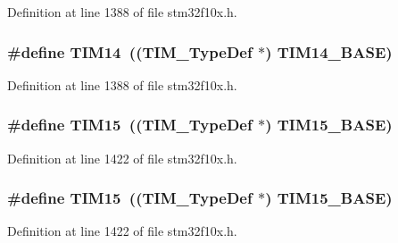Definition at line 1388 of file stm32f10x.\+h.

\subsubsection[{\texorpdfstring{T\+I\+M14}{TIM14}}]{\setlength{\rightskip}{0pt plus 5cm}\#define T\+I\+M14~(({\bf T\+I\+M\+\_\+\+Type\+Def} $\ast$) {\bf T\+I\+M14\+\_\+\+B\+A\+SE})}\hypertarget{group___peripheral__declaration_ga2dd30f46fad69dd73e1d8941a43daffe}{}\label{group___peripheral__declaration_ga2dd30f46fad69dd73e1d8941a43daffe}


Definition at line 1388 of file stm32f10x.\+h.

\subsubsection[{\texorpdfstring{T\+I\+M15}{TIM15}}]{\setlength{\rightskip}{0pt plus 5cm}\#define T\+I\+M15~(({\bf T\+I\+M\+\_\+\+Type\+Def} $\ast$) {\bf T\+I\+M15\+\_\+\+B\+A\+SE})}\hypertarget{group___peripheral__declaration_ga87e4b442041d1c03a6af113fbe04a182}{}\label{group___peripheral__declaration_ga87e4b442041d1c03a6af113fbe04a182}


Definition at line 1422 of file stm32f10x.\+h.

\subsubsection[{\texorpdfstring{T\+I\+M15}{TIM15}}]{\setlength{\rightskip}{0pt plus 5cm}\#define T\+I\+M15~(({\bf T\+I\+M\+\_\+\+Type\+Def} $\ast$) {\bf T\+I\+M15\+\_\+\+B\+A\+SE})}\hypertarget{group___peripheral__declaration_ga87e4b442041d1c03a6af113fbe04a182}{}\label{group___peripheral__declaration_ga87e4b442041d1c03a6af113fbe04a182}


Definition at line 1422 of file stm32f10x.\+h.

